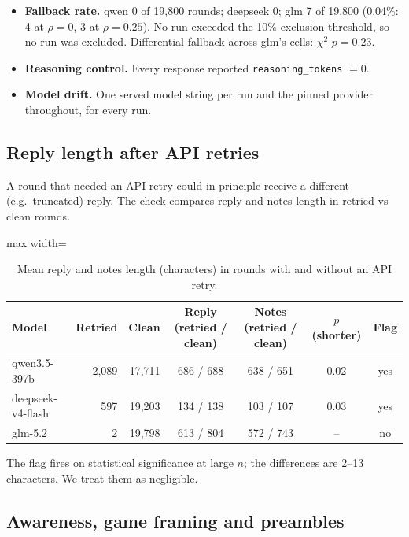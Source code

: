 \documentclass[11pt,letterpaper]{article}
\numberwithin{equation}{section}
\numberwithin{table}{section}
\numberwithin{figure}{section}
\numberwithin{algorithm}{section}
\begin{document}
\begin{itemize}
  \item \textbf{Fallback rate.} qwen 0 of 19{,}800 rounds; deepseek 0; glm 7 of 19{,}800 (0.04\%: 4 at $\rho=0$, 3 at $\rho=0.25$). No run exceeded the 10\% exclusion threshold, so no run was excluded. Differential fallback across glm's cells: $\chi^2$ $p=0.23$.
  \item \textbf{Reasoning control.} Every response reported \texttt{reasoning\_tokens} $=0$.
  \item \textbf{Model drift.} One served model string per run and the pinned provider throughout, for every run.
\end{itemize}

\subsection{Reply length after API retries}

A round that needed an API retry could in principle receive a different (e.g.\ truncated) reply. The check compares reply and notes length in retried vs clean rounds.

\begin{table}[h]
\centering\small
\caption{Mean reply and notes length (characters) in rounds with and without an API retry.}
\label{tab:retrylen}
\begin{adjustbox}{max width=\linewidth}
\begin{tabular}{lrrcccc}
\toprule
Model & Retried & Clean & Reply (retried / clean) & Notes (retried / clean) & $p$ (shorter) & Flag \\
\midrule
qwen3.5-397b & 2{,}089 & 17{,}711 & 686 / 688 & 638 / 651 & 0.02 & yes \\
deepseek-v4-flash & 597 & 19{,}203 & 134 / 138 & 103 / 107 & 0.03 & yes \\
glm-5.2 & 2 & 19{,}798 & 613 / 804 & 572 / 743 & -- & no \\
\bottomrule
\end{tabular}
\end{adjustbox}
\end{table}

\noindent The flag fires on statistical significance at large $n$; the differences are 2--13 characters. We treat them as negligible.

\subsection{Awareness, game framing and preambles}
\end{document}
